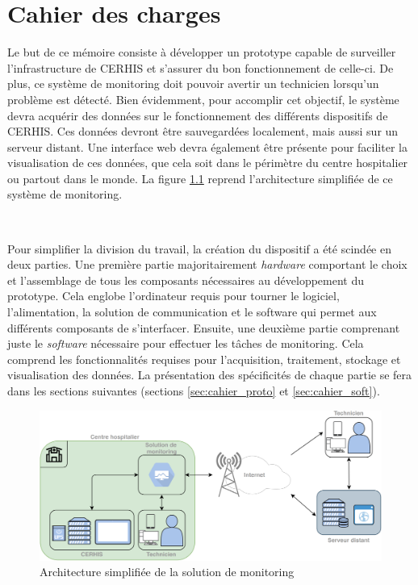 \chapter{Cahier des charges}
\label{chap:3}

\noindent
Le but de ce mémoire consiste à développer un prototype capable de surveiller l'infrastructure de CERHIS et s'assurer du bon fonctionnement de celle-ci. De plus, ce système de monitoring doit pouvoir avertir un technicien lorsqu'un problème est détecté. Bien évidemment, pour accomplir cet objectif, le système devra acquérir des données sur le fonctionnement des différents dispositifs de CERHIS. Ces données devront être sauvegardées localement, mais aussi sur un serveur distant. Une interface web devra également être présente pour faciliter la visualisation de ces données, que cela soit dans le périmètre du centre hospitalier ou partout dans le monde. La figure \ref{fig:mon_archi_simple} reprend l'architecture simplifiée de ce système de monitoring.

~

\noindent
Pour simplifier la division du travail, la création du dispositif a été scindée en deux parties.
Une première partie majoritairement \textit{hardware} comportant le choix et l'assemblage de tous les composants nécessaires au développement du prototype. Cela englobe l'ordinateur requis pour tourner le logiciel, l'alimentation, la solution de communication et le software qui permet aux différents composants de s'interfacer. Ensuite, une deuxième partie comprenant juste le \textit{software} nécessaire pour effectuer les tâches de monitoring. Cela comprend les fonctionnalités requises pour l'acquisition, traitement, stockage et visualisation des données. La présentation des spécificités de chaque partie se fera dans les sections suivantes (sections \ref{sec:cahier_proto} et \ref{sec:cahier_soft}).



\begin{figure}[ht!]
  \centering
  \includegraphics[width=\textwidth]{img/cahier_des_charges/baseline_archi.png}
  \caption{Architecture simplifiée de la solution de monitoring}
  \label{fig:mon_archi_simple}
\end{figure}

